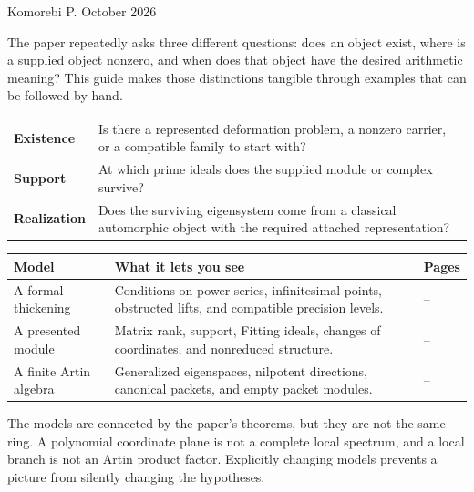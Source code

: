{\sffamily\small Komorebi P.\quad\textbullet{} October 2026}\par
The paper repeatedly asks three different questions: does an object exist, where is a supplied object nonzero, and when does that object have the desired arithmetic meaning? This guide makes those distinctions tangible through examples that can be followed by hand.

\begin{insight}
\begin{tabularx}{\linewidth}{@{}p{.18\linewidth}Y@{}}
\textbf{Existence} & Is there a represented deformation problem, a nonzero carrier, or a compatible family to start with?\\[3pt]
\textbf{Support} & At which prime ideals does the supplied module or complex survive?\\[3pt]
\textbf{Realization} & Does the surviving eigensystem come from a classical automorphic object with the required attached representation?
\end{tabularx}
\end{insight}

\begin{tabularx}{\linewidth}{@{}p{.20\linewidth}Y>{\raggedright\arraybackslash}p{.15\linewidth}@{}}\toprule
\textbf{Model} & \textbf{What it lets you see} & \textbf{Pages}\\\midrule
A formal thickening & Conditions on power series, infinitesimal points, obstructed lifts, and compatible precision levels. & --\\
A presented module & Matrix rank, support, Fitting ideals, changes of coordinates, and nonreduced structure. & --\\
A finite Artin algebra & Generalized eigenspaces, nilpotent directions, canonical packets, and empty packet modules. & --\\\bottomrule
\end{tabularx}

The models are connected by the paper's theorems, but they are not the same ring. A polynomial coordinate plane is not a complete local spectrum, and a local branch is not an Artin product factor. Explicitly changing models prevents a picture from silently changing the hypotheses.

